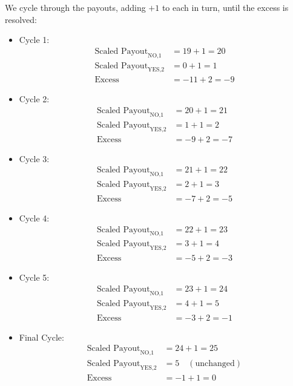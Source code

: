 \documentclass{article}
\begin{document}
We cycle through the payouts, adding \(+1\) to each in turn, until the excess is resolved:

\begin{itemize}
    \item Cycle 1:
    \begin{align*}
        \text{Scaled Payout}_{\text{NO,1}} &= 19 + 1 = 20 \\
        \text{Scaled Payout}_{\text{YES,2}} &= 0 + 1 = 1 \\
        \text{Excess} &= -11 + 2 = -9
    \end{align*}
    \item Cycle 2:
    \begin{align*}
        \text{Scaled Payout}_{\text{NO,1}} &= 20 + 1 = 21 \\
        \text{Scaled Payout}_{\text{YES,2}} &= 1 + 1 = 2 \\
        \text{Excess} &= -9 + 2 = -7
    \end{align*}
    \item Cycle 3:
    \begin{align*}
        \text{Scaled Payout}_{\text{NO,1}} &= 21 + 1 = 22 \\
        \text{Scaled Payout}_{\text{YES,2}} &= 2 + 1 = 3 \\
        \text{Excess} &= -7 + 2 = -5
    \end{align*}
    \item Cycle 4:
    \begin{align*}
        \text{Scaled Payout}_{\text{NO,1}} &= 22 + 1 = 23 \\
        \text{Scaled Payout}_{\text{YES,2}} &= 3 + 1 = 4 \\
        \text{Excess} &= -5 + 2 = -3
    \end{align*}
    \item Cycle 5:
    \begin{align*}
        \text{Scaled Payout}_{\text{NO,1}} &= 23 + 1 = 24 \\
        \text{Scaled Payout}_{\text{YES,2}} &= 4 + 1 = 5 \\
        \text{Excess} &= -3 + 2 = -1
    \end{align*}
    \item Final Cycle:
    \begin{align*}
        \text{Scaled Payout}_{\text{NO,1}} &= 24 + 1 = 25 \\
        \text{Scaled Payout}_{\text{YES,2}} &= 5 \quad (\text{unchanged}) \\
        \text{Excess} &= -1 + 1 = 0
    \end{align*}
\end{itemize}
\end{document}
